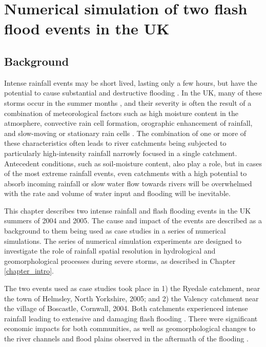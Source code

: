 \chapter{Numerical simulation of two flash flood events in the UK}
\label{chapter_events}

\section{Background}
Intense rainfall events may be short lived, lasting only a few hours, but have the potential to cause substantial and destructive flooding \citep{lane2008climate,pitt2008pitt}. In the UK, many of these storms occur in the summer months \citep{Kendon2014}, and their severity is often the result of a combination of meteorological factors such as high moisture content in the atmosphere, convective rain cell formation, orographic enhancement of rainfall, and slow-moving or stationary rain cells \citep{Barros1994,golding2005boscastle,sibley2009analysis,warren2014boscastle}. The combination of one or more of these characteristics often leads to river catchments being subjected to particularly high-intensity rainfall narrowly focused in a single catchment. Antecedent conditions, such as soil-moisture content, also play a role, but in cases of the most extreme rainfall events, even catchments with a high potential to absorb incoming rainfall or slow water flow towards rivers will be overwhelmed with the rate and volume of water input and flooding will be inevitable.

This chapter describes two intense rainfall and flash flooding events in the UK summers of 2004 and 2005. The cause and impact of the events are described as a background to them being used as case studies in a series of numerical simulations. The series of numerical simulation experiments are designed to investigate the role of rainfall spatial resolution in hydrological and geomorphological processes during severe storms, as described in Chapter \ref{chapter_intro}. %

The two events used as case studies took place in 1) the Ryedale catchment, near the town of Helmsley, North Yorkshire, 2005; and  2) the Valency catchment near the village of Boscastle, Cornwall, 2004. Both catchments experienced intense rainfall leading to extensive and damaging flash flooding \citep{golding2005boscastle,sibley2009analysis}. There were significant economic impacts for both communities, as well as geomorphological changes to the river channels and flood plains observed in the aftermath of the flooding \citep{wallingford2005flooding,wass2008investigation}.

